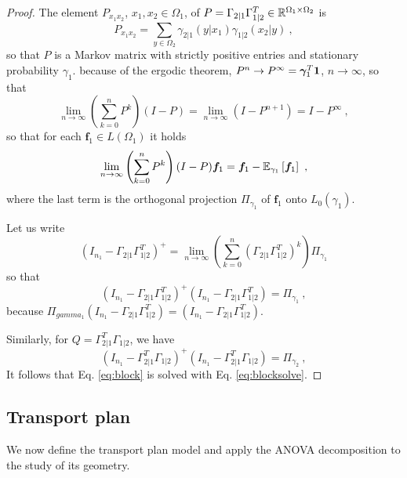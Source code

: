 \documentclass[12pt,a4paper]{amsart}
\begin{document}
\begin{proof}
The element $P_{x_1x_2}$, $x_1,x_2 \in \Omega_1$, of $P = \Gamma_{2|1}\Gamma_{1|2}^T \in \mathbb R^{\Omega_1 \times \Omega_2}$ is
%
\begin{equation*}
  P_{x_1x_2} = \sum_{y \in \Omega_2} \gamma_{2|1}(y|x_1) \gamma_{1|2}(x_2|y) \ ,
\end{equation*}
%
so that $P$ is a Markov matrix with strictly positive entries and stationary probability $\gamma_1$. because of the ergodic theorem, $P^n \to P^\infty = {\bm \gamma}_1^T \bm 1$, $n \to \infty$, so that 
%
\begin{equation*}
\lim_{n\to\infty} \left(\sum_{k=0}^n P^k\right)(I-P) = \lim_{n\to\infty} \left(I - P^{n+1}\right) = I - P^\infty \ , 
\end{equation*}
%
so that for each $\bm f_1 \in L(\Omega_1)$ it holds
%
\begin{equation*}
  \lim_{n\to\infty} \left(\sum_{k=0}^n P^k\right)(I-P) \bm f_1 = \bm f_1 - {\operatorname{\mathbb E}}_{\gamma_1}\left[\bm f_1\right] \ ,
\end{equation*}
%
where the last term is the orthogonal projection $\Pi_{\gamma_1}$ of $\bm f_1$ onto $L_0(\gamma_1)$. 

Let us write
%
\begin{equation*}
  (I_{n_1}-\Gamma_{2|1}\Gamma_{1|2}^T)^{+} = \lim_{n\to\infty} \left(\sum_{k=0}^n (\Gamma_{2|1}\Gamma_{1|2}^T)^k\right) \Pi_{\gamma_1}  
\end{equation*}
%
so that
%
\begin{equation*}
  (I_{n_1}-\Gamma_{2|1}\Gamma_{1|2}^T)^{+}(I_{n_1}-\Gamma_{2|1}\Gamma_{1|2}^T) = \Pi_{\gamma_1} \ ,
\end{equation*}
%
because $\Pi_{gamma_1} (I_{n_1}-\Gamma_{2|1}\Gamma_{1|2}^T) = (I_{n_1}-\Gamma_{2|1}\Gamma_{1|2}^T)$.

Similarly, for $Q = \Gamma_{2|1}^T\Gamma_{1|2}$, we have
%
\begin{equation*}
  (I_{n_1}-\Gamma_{2|1}^T\Gamma_{1|2})^{+}(I_{n_1}-\Gamma_{2|1}^T\Gamma_{1|2}) = \Pi_{\gamma_2} \ ,
\end{equation*}
%
It follows that Eq. \eqref{eq:block} is solved with Eq. \eqref{eq:blocksolve}.
\end{proof}

\subsection{Transport plan}

We now define the transport plan model and apply the ANOVA decomposition to the study of its geometry. 
\end{document}
